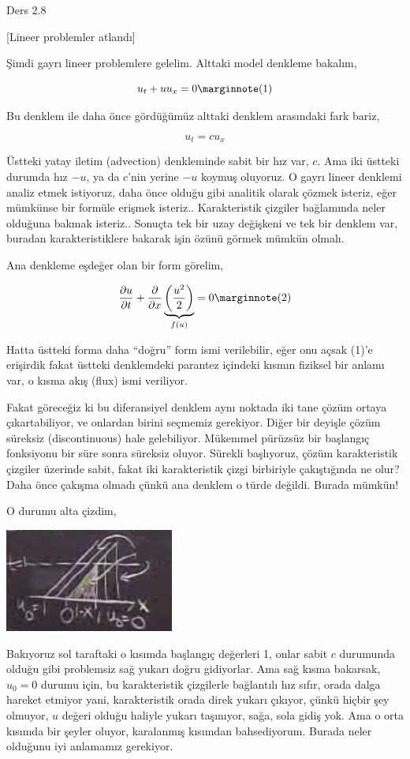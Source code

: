 \documentclass[12pt,fleqn]{article}\usepackage{../../common}
\begin{document}
Ders 2.8

[Lineer problemler atlandı]

Şimdi gayrı lineer problemlere gelelim. Alttaki model denkleme bakalım,

$$
u_t + u u_x = 0
\mlabel{1}
$$

Bu denklem ile daha önce gördüğümüz alttaki denklem arasındaki fark bariz,

$$
u_t = c u_x
$$

Üstteki yatay iletim (advection) denkleminde sabit bir hız var, $c$. Ama iki
üstteki durumda hız $-u$, ya da $c$'nin yerine $-u$ koymuş oluyoruz.  O gayrı
lineer denklemi analiz etmek istiyoruz, daha önce olduğu gibi analitik olarak
çözmek isteriz, eğer mümkünse bir formüle erişmek isteriz.. Karakteristik
çizgiler bağlamında neler olduğuna bakmak isteriz.. Sonuçta tek bir uzay
değişkeni ve tek bir denklem var, buradan karakteristiklere bakarak işin
özünü görmek mümkün olmalı.

Ana denkleme eşdeğer olan bir form görelim,

$$
\frac{\partial u}{\partial t} +
\frac{\partial }{\partial x}
\underbrace{ \left( \frac{u^2}{2} \right)}_{f(u)} = 0
\mlabel{2}
$$

Hatta üstteki forma daha ``doğru'' form ismi verilebilir, eğer onu açsak (1)'e
erişirdik fakat üstteki denklemdeki parantez içindeki kısmın fiziksel bir anlamı
var, o kısma akış (flux) ismi veriliyor.

Fakat göreceğiz ki bu diferansiyel denklem aynı noktada iki tane çözüm ortaya
çıkartabiliyor, ve onlardan birini seçmemiz gerekiyor. Diğer bir deyişle çözüm
süreksiz (discontinuous) hale gelebiliyor. Mükemmel pürüzsüz bir başlangıç
fonksiyonu bir süre sonra süreksiz oluyor. Sürekli başlıyoruz, çözüm
karakteristik çizgiler üzerinde sabit, fakat iki karakteristik çizgi birbiriyle
çakıştığında ne olur? Daha önce çakışma olmadı çünkü ana denklem o türde
değildi. Burada mümkün!

O durumu alta çizdim,

\includegraphics[width=15em]{compscieng_2_08_01.png}

Bakıyoruz sol taraftaki o kısımda başlangıç değerleri 1, onlar sabit $c$
durumunda olduğu gibi problemsiz sağ yukarı doğru gidiyorlar. Ama sağ kısma
bakarsak, $u_0=0$ durumu için, bu karakteristik çizgilerle bağlantılı hız
sıfır, orada dalga hareket etmiyor yani, karakteristik orada direk yukarı
çıkıyor, çünkü hiçbir şey olmuyor, $u$ değeri olduğu haliyle yukarı taşınıyor,
sağa, sola gidiş yok. Ama o orta kısımda bir şeyler oluyor, karalanmış
kısımdan bahsediyorum. Burada neler olduğunu iyi anlamamız gerekiyor.
\end{document}
